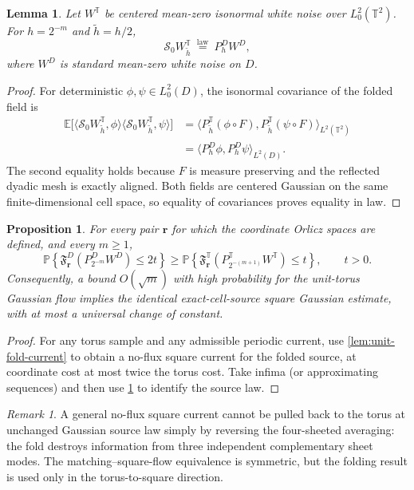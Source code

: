 \documentclass[11pt]{article}
\newtheorem{proposition}[proposition]{Proposition}
\newtheorem{lemma}[lemma]{Lemma}
\theoremstyle{definition}
\theoremstyle{remark}
\newtheorem{remark}[remark]{Remark}
\numberwithin{equation}{section}
\newcommand{\T}{\mathbb T}
\begin{document}
\begin{lemma}
\label{lem:noise-fold}
Let $W^{\T}$ be centered mean-zero isonormal white noise over
$L_0^2(\T^2)$. For $h=2^{-m}$ and $\widetilde h=h/2$,
\begin{equation}
 \mathscr S_0W_{\widetilde h}^{\T}
 \ \stackrel{\mathrm{law}}=\ P_h^{D}W^D,
 \label{eq:exact-fold-law}
\end{equation}
where $W^D$ is standard mean-zero white noise on $D$.
\end{lemma}
\begin{proof}
For deterministic $\phi,\psi\in L_0^2(D)$, the isonormal
covariance of the folded field is
\begin{align*}
 \mathbb E\bigl[\langle\mathscr S_0W_{\widetilde h}^{\T},
 \phi\rangle\langle\mathscr S_0W_{\widetilde h}^{\T},
 \psi\rangle\bigr]
 &=\langle P_{\widetilde h}^{\T}(\phi\circ F),
 P_{\widetilde h}^{\T}(\psi\circ F)\rangle_{L^2(\T^2)}\\
 &=\langle P_h^{D}\phi,P_h^{D}\psi\rangle_{L^2(D)}.
\end{align*}
The second equality holds because $F$ is measure preserving and the
reflected dyadic mesh is exactly aligned. Both fields are centered
Gaussian on the same finite-dimensional cell space, so equality of
covariances proves equality in law.
\end{proof}

\begin{proposition}
\label{prop:torus-implies-square}
For every pair $\boldsymbol r$ for which the coordinate Orlicz
spaces are defined, and every $m\ge1$,
\[
 \mathbb P\left\{\mathfrak F_{\boldsymbol r}^{D}
 (P_{2^{-m}}^{D}W^D)\le2t\right\}
 \ge
 \mathbb P\left\{\mathfrak F_{\boldsymbol r}^{\T}
 (P_{2^{-(m+1)}}^{\T}W^{\T})\le t\right\},
 \qquad t>0.
\]
Consequently, a bound $O(\sqrt m)$ with high probability for the
unit-torus Gaussian flow implies the identical exact-cell-source
square Gaussian estimate, with at most a universal change of constant.
\end{proposition}
\begin{proof}
For any torus sample and any admissible periodic current, use
\cref{lem:unit-fold-current} to obtain a no-flux square current for the
folded source, at coordinate cost at most twice the torus cost.
Take infima (or approximating sequences) and then use
\cref{lem:noise-fold} to identify the source law.
\end{proof}

\begin{remark}
A general no-flux square current cannot be pulled back to the torus at
unchanged Gaussian source law simply by reversing the four-sheeted
averaging: the fold destroys information from three independent
complementary sheet modes. The matching--square-flow equivalence is
symmetric, but the folding result is used only in the
torus-to-square direction.
\end{remark}
\end{document}
